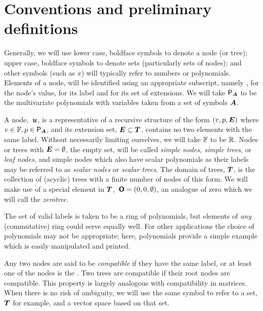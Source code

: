 \section{Conventions and preliminary definitions}

Generally, we will use lower case, boldface symbols to denote a node
(or tree); upper case, boldface symbols to denote sets
(particularly sets of nodes); and other symbols (such as \(x\)) will
typically refer to numbers or \polyrat polynomials. Elements of a node,
 will be identified using an appropriate subscript, namely
, for the node's value,  for its label and 
for its set of extensions.  We will take $\mathsf{P}_{\boldsymbol{A}}$ to be the \polytype
multivariate polynomials with variables taken from a set of symbols
$\boldsymbol{A}$.

\begin{definition}
A node, $\,\boldsymbol{u}$, is a representative of a recursive structure of
the form $(v, p, \boldsymbol{E})$ where $v \in \mathbb{F}, p \in \mathsf{P}_{\boldsymbol{A}}$, and
its extension set, $\boldsymbol{E} \subset \boldsymbol{T}$, contains no two elements
with the same label. Without necessarily limiting ourselves, we will
take $\mathbb{F}$ to be $\mathbb{R}$.  Nodes or trees with \(\boldsymbol{E} =
\emptyset\), the empty set, will be called \emph{simple nodes, simple
  trees}, or \emph{leaf nodes}, and simple nodes which also have
scalar polynomials as their labels may be referred to as \emph{scalar
  nodes} or \emph{scalar trees}. The domain of trees, $\boldsymbol{T}$, is the
collection of (acyclic) trees with a finite number of nodes of this
form.
We will make use of a special element in $\boldsymbol{T}$, $\,\boldsymbol{\mathsf{O}} = (0, 0,
\emptyset)$, an analogue of zero which we will call the
\emph{zerotree}.

The set of valid labels is taken to be a ring of polynomials, but
elements of \emph{any} (commutative) ring could serve equally well.
For other applications the choice of polynomials may not be
appropriate; here, polynomials provide a simple example which is
easily manipulated and printed.
\end{definition}

Any two nodes are said to be \emph{compatible} if they have the same
label, or at least one of the nodes is the \tzerotree. Two trees are
compatible if their root nodes are compatible.   This property is largely analogous with
compatibility in matrices.  When there is no risk
of ambiguity, we will use the same symbol to refer to a set, $\boldsymbol{T}$
for example, and a vector space based on that set.

